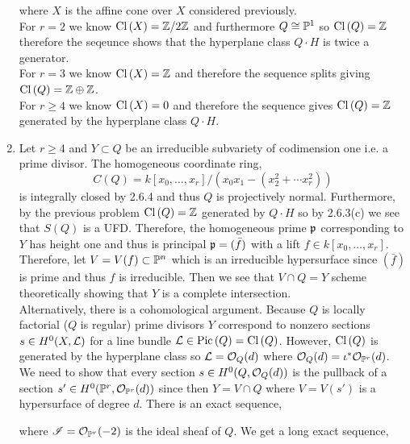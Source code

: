 \documentclass[12pt]{article}
\begin{document}
\begin{enumerate}
\begin{center}
\begin{tikzcd}
\end{tikzcd}
\end{center}
where $X$ is the affine cone over $X$ considered previously. 
\bigskip\\
For $r = 2$ we know $\Cl{X} = \Z / 2 \Z$ and furthermore $Q \cong \P^1$ so $\Cl{Q} = \Z$ therefore the seqeunce shows that the hyperplane class $Q \cdot H$ is twice a generator.
\bigskip\\
For $r = 3$ we know $\Cl{X} = \Z$ and therefore the sequence splits giving $\Cl{Q} = \Z \oplus \Z$.
\bigskip\\
For $r \ge 4$ we know $\Cl{X} = 0$ and therefore the sequence gives $\Cl{Q} = \Z$ generated by the hyperplane class $Q \cdot H$.

\item Let $r \ge 4$ and $Y \subset Q$ be an irreducible subvariety of codimension one i.e. a prime divisor. The homogeneous coordinate ring,
\[ C(Q) = k[x_0, \dots, x_r]/(x_0 x_1 - (x_2^2 + \cdots x_r^2)) \]
is integrally closed by 2.6.4 and thus $Q$ is projectively normal. Furthermore, by the previous problem $\Cl{Q} = \Z$ generated by $Q \cdot H$ so by 2.6.3(c) we see that $S(Q)$ is a UFD. Therefore, the homogeneous prime $\p$ corresponding to $Y$ has height one and thus is principal $\p = (\bar{f})$ with a lift $f \in k[x_0, \dots, x_r]$. Therefore, let $V = V(f) \subset \P^n$ which is an irreducible hypersurface since $(\bar{f})$ is prime and thus $f$ is irreducible. Then we see that $V \cap Q = Y$ scheme theoretically showing that $Y$ is a complete intersection.
\bigskip\\
Alternatively, there is a cohomological argument. Because $Q$ is locally factorial ($Q$ is regular) prime divisors $Y$ correspond to nonzero sections $s \in H^0(X, \L)$ for a line bundle $\L \in \Pic{Q} = \Cl{Q}$. However, $\Cl{Q}$ is generated by the hyperplane class so $\L = \struct{Q}(d)$ where $\struct{Q}(d) = \iota^* \struct{\P^r}(d)$. We need to show that every section $s \in H^0(Q, \struct{Q}(d))$ is the pullback of a section $s' \in H^0(\P^r, \struct{\P^r}(d))$ since then $Y = V \cap Q$ where $V = V(s')$ is a hypersurface of degree $d$. There is an exact sequence,
\begin{center}
\end{center}
where $\I = \struct{\P^r}(-2)$ is the ideal sheaf of $Q$. We get a long exact sequence,

\end{enumerate}
\end{document}

